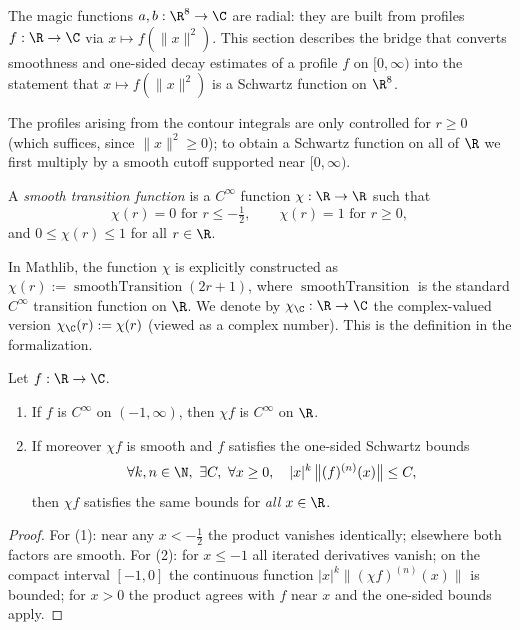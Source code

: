 The magic functions $a, b : \R^8 \to \C$ are radial: they are built from profiles
$f : \R \to \C$ via $x \mapsto f(\|x\|^2)$. This section describes the bridge that converts
smoothness and one-sided decay estimates of a profile $f$ on $[0, \infty)$ into the statement
that $x \mapsto f(\|x\|^2)$ is a Schwartz function on $\R^8$.

The profiles arising from the contour integrals are only controlled for $r \geq 0$ (which
suffices, since $\|x\|^2 \geq 0$); to obtain a Schwartz function on all of $\R$ we first multiply
by a smooth cutoff supported near $[0, \infty)$.

\begin{definition}\label{def:smooth-transition}\leanok
  A \emph{smooth transition function} is a $C^\infty$ function $\chi : \R \to \R$ such that
  \[
    \chi(r) = 0 \text{ for } r \le -\tfrac12, \qquad
    \chi(r) = 1 \text{ for } r \ge 0,
  \]
  and $0 \le \chi(r) \le 1$ for all $r \in \R$.
\end{definition}

\begin{remark}\label{def:radial-cutoff}
  In Mathlib, the function $\chi$ is explicitly constructed as $\chi(r) := \operatorname{smoothTransition}(2r + 1)$,
  where $\operatorname{smoothTransition}$ is the standard $C^\infty$ transition function on $\R$.
  We denote by $\chi_\C : \R \to \C$ the complex-valued version $\chi_\C(r) := \chi(r)$ (viewed as a
  complex number). This is the definition \leanok in the formalization.
\end{remark}

\begin{lemma}\label{lemma:cutoff-mul-decay}\leanok
  Let $f : \R \to \C$.
  \begin{enumerate}
    \item If $f$ is $C^\infty$ on $(-1, \infty)$, then $\chi f$ is $C^\infty$ on $\R$.
    \item If moreover $\chi f$ is smooth and $f$ satisfies the one-sided Schwartz bounds
      \[
        \forall k, n \in \N, \ \exists C, \ \forall x \ge 0, \quad
          |x|^k \, \bigl\| (f)^{(n)}(x) \bigr\| \le C,
      \]
      then $\chi f$ satisfies the same bounds for \emph{all} $x \in \R$.
  \end{enumerate}
\end{lemma}
\begin{proof}\leanok
  For (1): near any $x < -\tfrac12$ the product vanishes identically; elsewhere both factors are
  smooth. For (2): for $x \le -1$ all iterated derivatives vanish; on the compact interval
  $[-1, 0]$ the continuous function $|x|^k \|(\chi f)^{(n)}(x)\|$ is bounded; for $x > 0$ the
  product agrees with $f$ near $x$ and the one-sided bounds apply.
\end{proof}

